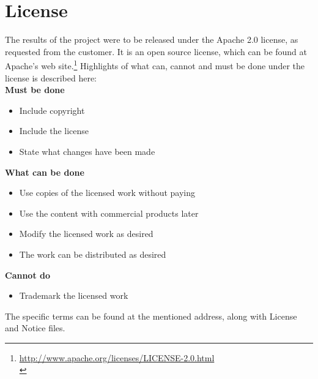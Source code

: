 \section{License}
The results of the project were to be released under the Apache 2.0 license, as requested from the customer. It is an open source license, which can be found  at Apache's web site.\footnote{\url{http://www.apache.org/licenses/LICENSE-2.0.html}\\}
Highlights of what can, cannot and must be done under the license is described here:\\
\textbf{Must be done}
\begin{itemize}
\item Include copyright
\item Include the license
\item State what changes have been made
\end{itemize}
\textbf{What can be done}
\begin{itemize}
\item Use copies of the licensed work without paying
\item Use the content with commercial products later
\item Modify the licensed work as desired
\item The work can be distributed as desired
\end{itemize}
\textbf{Cannot do}
\begin{itemize}
\item Trademark the licensed work
\end{itemize}
The specific terms can be found at the mentioned address, along with License and Notice files.
